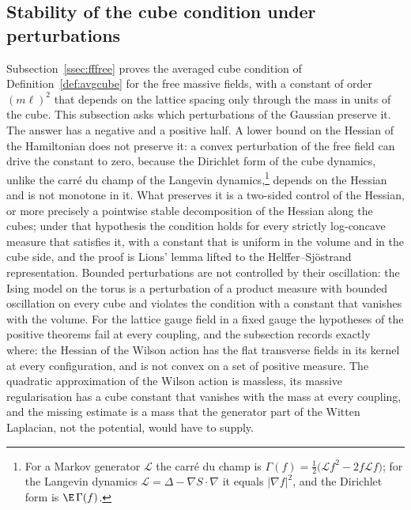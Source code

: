 \subsection{Stability of the cube condition under perturbations}\label{ssec:rSstab}

Subsection~\ref{ssec:fffree} proves the averaged cube condition of
Definition~\ref{def:avgcube} for the free massive fields, with a constant of
order $(m\ell)^2$ that depends on the lattice spacing only through the mass in
units of the cube. This subsection asks which perturbations of the Gaussian
preserve it. The answer has a negative and a positive half. A lower bound on
the Hessian of the Hamiltonian does not preserve it: a convex perturbation of
the free field can drive the constant to zero, because the Dirichlet form of
the cube dynamics, unlike the carr\'e du champ of the Langevin dynamics,\footnote{For a Markov generator $\mathcal L$ the carr\'e du champ is $\Gamma(f)=\frac12\bigl(\mathcal L f^2-2f\mathcal Lf\bigr)$; for the Langevin dynamics $\mathcal L=\Delta-\nabla S\cdot\nabla$ it equals $\lvert\nabla f\rvert^2$, and the Dirichlet form is $\E\,\Gamma(f)$.}
depends on the Hessian and is not monotone in it. What preserves it is a
two-sided control of the Hessian, or more precisely a pointwise stable
decomposition of the Hessian along the cubes; under that hypothesis the
condition holds for every strictly log-concave measure that satisfies it, with
a constant that is uniform in the volume and in the cube side, and the proof is
Lions' lemma lifted to the Helffer--Sj\"ostrand representation. Bounded
perturbations are not controlled by their oscillation: the Ising model on the
torus is a perturbation of a product measure with bounded oscillation on every
cube and violates the condition with a constant that vanishes with the volume.
For the lattice gauge field in a fixed gauge the hypotheses of the positive
theorems fail at every coupling, and the subsection records exactly where: the
Hessian of the Wilson action has the flat transverse fields in its kernel at
every configuration, and is not convex on a set of positive measure. The
quadratic approximation of the Wilson action is massless, its massive
regularisation has a cube constant that vanishes with the mass at every
coupling, and the missing estimate is a mass that the generator part of the
Witten Laplacian, not the potential, would have to supply.

